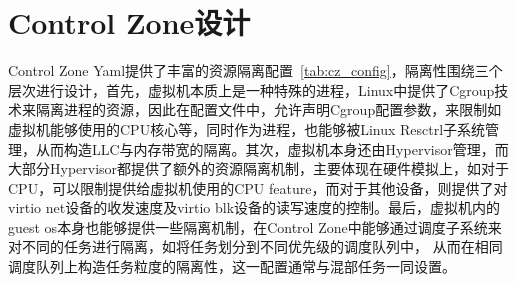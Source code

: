 \section{Control Zone设计}


Control Zone Yaml提供了丰富的资源隔离配置~\ref{tab:cz_config}，隔离性围绕三个层次进行设计，首先，虚拟机本质上是一种特殊的进程，Linux中提供了Cgroup技术来隔离进程的资源，因此在配置文件中，允许声明Cgroup配置参数，来限制如虚拟机能够使用的CPU核心等，同时作为进程，也能够被Linux Resctrl子系统管理，从而构造LLC与内存带宽的隔离。其次，虚拟机本身还由Hypervisor管理，而大部分Hypervisor都提供了额外的资源隔离机制，主要体现在硬件模拟上，如对于CPU，可以限制提供给虚拟机使用的CPU feature，而对于其他设备，则提供了对virtio net设备的收发速度及virtio blk设备的读写速度的控制。最后，虚拟机内的guest os本身也能够提供一些隔离机制，在Control Zone中能够通过调度子系统来对不同的任务进行隔离，如将任务划分到不同优先级的调度队列中， 从而在相同调度队列上构造任务粒度的隔离性，这一配置通常与混部任务一同设置。

